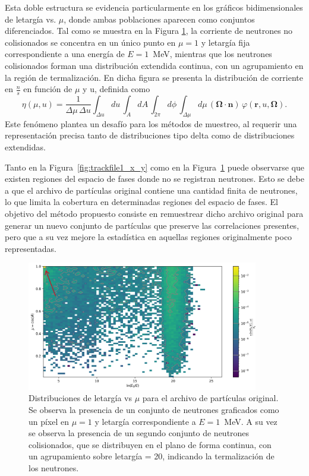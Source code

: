 Esta doble estructura se evidencia particularmente en los gráficos bidimensionales de letargía vs. $\mu$, donde ambas poblaciones aparecen como conjuntos diferenciados. Tal como se muestra en la Figura \ref{fig:trackfile1_letargia_mu_2}, la corriente de neutrones no colisionados se concentra en un único punto en $\mu = 1$ y letargía fija correspondiente a una energía de $E = 1$~MeV, mientras que los neutrones colisionados forman una distribución extendida continua, con un agrupamiento en la región de termalización. En dicha figura se presenta la distribución de corriente en $\frac{n}{s}$ en función de $\mu$ y u, definida como
\begin{equation}
    \eta(\mu,u) = \frac{1}{\Delta \mu \, \Delta u}
    \int_{\Delta u} du \,
    \int_{A} dA \,
    \int_{2\pi} d\phi \,
    \int_{\Delta \mu} d\mu\,(\mathbf{\Omega}\cdot \mathbf{n})\,
    \varphi(\mathbf{r},u,\mathbf{\Omega}).
\end{equation}
 Este fenómeno plantea un desafío para los métodos de muestreo, al requerir una representación precisa tanto de distribuciones tipo delta como de distribuciones extendidas.

Tanto en la Figura~\ref{fig:trackfile1_x_y} como en la Figura~\ref{fig:trackfile1_letargia_mu_2} puede observarse que existen regiones del espacio de fases donde no se registran neutrones. Esto se debe a que el archivo de partículas original contiene una cantidad finita de neutrones, lo que limita la cobertura en determinadas regiones del espacio de fases. El objetivo del método propuesto consiste en remuestrear dicho archivo original para generar un nuevo conjunto de partículas que preserve las correlaciones presentes, pero que a su vez mejore la estadística en aquellas regiones originalmente poco representadas.

\begin{figure}[H]
    \centering
    \includegraphics[width=0.9\textwidth]{figs/fig4_3.png}
    \caption{Distribuciones de letargía vs $\mu$ para el archivo de partículas original. Se observa la presencia de un conjunto de neutrones graficados como un píxel en $\mu = 1$ y letargía correspondiente a $E = 1$~MeV. A su vez se observa la presencia de un segundo conjunto de neutrones colisionados, que se distribuyen en el plano de forma continua, con un agrupamiento sobre letargía = 20, indicando la termalización de los neutrones.}
    \label{fig:trackfile1_letargia_mu_2}
\end{figure}
